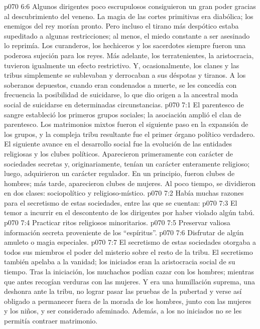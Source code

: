 \vs p070 6:6 \pc Algunos dirigentes poco escrupulosos consiguieron un gran poder gracias al descubrimiento del veneno. La magia de las cortes primitivas era diabólica; los enemigos del rey morían pronto. Pero incluso el tirano más despótico estaba supeditado a algunas restricciones; al menos, el miedo constante a ser asesinado lo reprimía. Los curanderos, los hechiceros y los sacerdotes siempre fueron una poderosa sujeción para los reyes. Más adelante, los terratenientes, la aristocracia, tuvieron igualmente un efecto restrictivo. Y, ocasionalmente, los clanes y las tribus simplemente se sublevaban y derrocaban a sus déspotas y tiranos. A los soberanos depuestos, cuando eran condenados a muerte, se les concedía con frecuencia la posibilidad de suicidarse, lo que dio origen a la ancestral moda social de suicidarse en determinadas circunstancias.
\vs p070 7:1 El parentesco de sangre estableció los primeros grupos sociales; la asociación amplió el clan de parentesco. Los matrimonios mixtos fueron el siguiente paso en la expansión de los grupos, y la compleja tribu resultante fue el primer órgano político verdadero. El siguiente avance en el desarrollo social fue la evolución de las entidades religiosas y los clubes políticos. Aparecieron primeramente con carácter de sociedades secretas y, originariamente, tenían un carácter enteramente religioso; luego, adquirieron un carácter regulador. En un principio, fueron clubes de hombres; más tarde, aparecieron clubes de mujeres. Al poco tiempo, se dividieron en dos clases: sociopolítico y religioso\hyp{}místico.
\vs p070 7:2 \pc Había muchas razones para el secretismo de estas sociedades, entre las que se cuentan:
\vs p070 7:3 El temor a incurrir en el descontento de los dirigentes por haber violado algún tabú.
\vs p070 7:4 Practicar ritos religiosos minoritarios.
\vs p070 7:5 Preservar valiosa información secreta proveniente de los “espíritus”.
\vs p070 7:6 Disfrutar de algún amuleto o magia especiales.
\vs p070 7:7 \pc El secretismo de estas sociedades otorgaba a todos sus miembros el poder del misterio sobre el resto de la tribu. El secretismo también apelaba a la vanidad; los iniciados eran la aristocracia social de su tiempo. Tras la iniciación, los muchachos podían cazar con los hombres; mientras que antes recogían verduras con las mujeres. Y era una humillación suprema, una deshonra ante la tribu, no lograr pasar las pruebas de la pubertad y verse así obligado a permanecer fuera de la morada de los hombres, junto con las mujeres y los niños, y ser considerado afeminado. Además, a los no iniciados no se les permitía contraer matrimonio.
